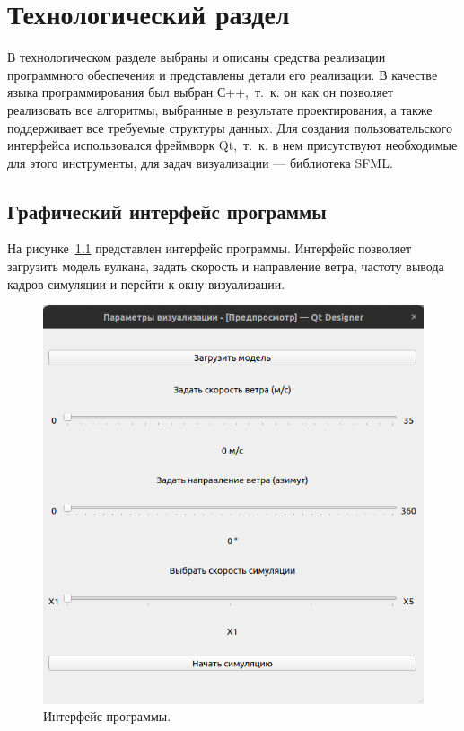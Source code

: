 \chapter{Технологический раздел}

В технологическом разделе выбраны и описаны средства реализации программного обеспечения и представлены детали его реализации.
В качестве языка программирования был выбран С++,~т.~к. он 
как он позволяет реализовать все алгоритмы, выбранные в результате проектирования, а также поддерживает все требуемые структуры данных. Для создания пользовательского интерфейса использовался фреймворк Qt,~т.~к. в нем присутствуют необходимые для этого инструменты, для задач визуализации --- библиотека SFML.

\section{Графический интерфейс программы}
На рисунке~\ref{fig:interface} представлен интерфейс программы. Интерфейс позволяет загрузить модель вулкана, задать скорость и направление ветра, частоту вывода кадров симуляции и перейти к окну визуализации. 

\begin{figure}[H]
	\centering
	\includegraphics[width=1.0\textwidth, page=1]{assets/img/interface.png}   
	\caption{Интерфейс программы.}
	\label{fig:interface}
\end{figure}
